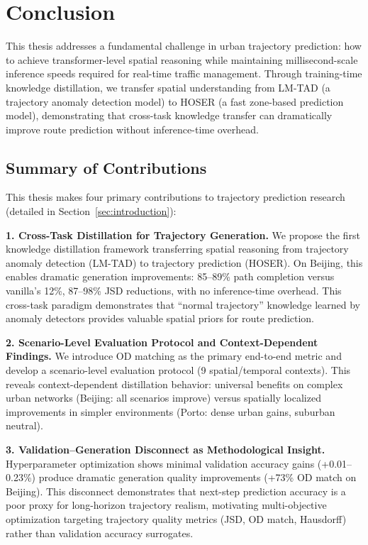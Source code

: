 
\section{Conclusion}
\label{sec:conclusion}

This thesis addresses a fundamental challenge in urban trajectory prediction: how to achieve transformer-level spatial reasoning while maintaining millisecond-scale inference speeds required for real-time traffic management. Through training-time knowledge distillation, we transfer spatial understanding from LM-TAD (a trajectory anomaly detection model) to HOSER (a fast zone-based prediction model), demonstrating that cross-task knowledge transfer can dramatically improve route prediction without inference-time overhead.

\subsection{Summary of Contributions}
\label{sec:conclusion-contributions}

This thesis makes four primary contributions to trajectory prediction research (detailed in Section~\ref{sec:introduction}):

\textbf{1. Cross-Task Distillation for Trajectory Generation.} We propose the first knowledge distillation framework transferring spatial reasoning from trajectory anomaly detection (LM-TAD) to trajectory prediction (HOSER). On Beijing, this enables dramatic generation improvements: 85--89\% path completion versus vanilla's 12\%, 87--98\% JSD reductions, with no inference-time overhead. This cross-task paradigm demonstrates that ``normal trajectory'' knowledge learned by anomaly detectors provides valuable spatial priors for route prediction.

\textbf{2. Scenario-Level Evaluation Protocol and Context-Dependent Findings.} We introduce OD matching as the primary end-to-end metric and develop a scenario-level evaluation protocol (9 spatial/temporal contexts). This reveals context-dependent distillation behavior: universal benefits on complex urban networks (Beijing: all scenarios improve) versus spatially localized improvements in simpler environments (Porto: dense urban gains, suburban neutral).

\textbf{3. Validation--Generation Disconnect as Methodological Insight.} Hyperparameter optimization shows minimal validation accuracy gains (+0.01--0.23\%) produce dramatic generation quality improvements (+73\% OD match on Beijing). This disconnect demonstrates that next-step prediction accuracy is a poor proxy for long-horizon trajectory realism, motivating multi-objective optimization targeting trajectory quality metrics (JSD, OD match, Hausdorff) rather than validation accuracy surrogates.

